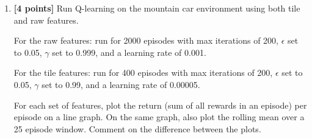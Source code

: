 \documentclass[11pt]{article}
\numberwithin{equation}{section} %
\numberwithin{figure}{section} %
\numberwithin{table}{section} %
\begin{document}
\begin{enumerate}
\item \textbf{[4 points]} Run Q-learning on the mountain car environment using both tile and raw features. 

For the raw features: run for 2000 episodes with max iterations of 200, $\epsilon$ set to 0.05, $\gamma$ set to 0.999, and a learning rate of 0.001. 

For the tile features: run for 400 episodes with max iterations of 200, $\epsilon$ set to 0.05, $\gamma$ set to 0.99, and a learning rate of 0.00005.

For each set of features, plot the return (sum of all rewards in an episode) per episode on a line graph. On the same graph, also plot the rolling mean over a 25 episode window. Comment on the difference between the plots.

\begin{tcolorbox}[fit,height=12cm, width=\linewidth, blank, borderline={1pt}{-2pt},nobeforeafter]
\end{tcolorbox}

\end{enumerate}
\end{document}
